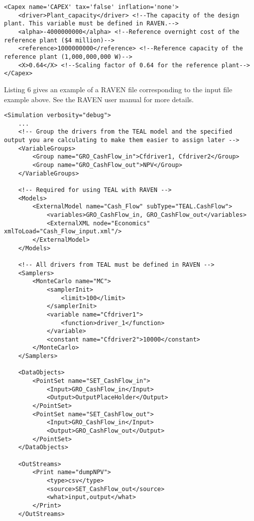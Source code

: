 \begin{lstlisting}[style=XML,morekeywords={anAttribute},caption=CashFlow input example., label=lst:CashFlowExample]
<Capex name='CAPEX' tax='false' inflation='none'>
    <driver>Plant_capacity</driver> <!--The capacity of the design plant. This variable must be defined in RAVEN.-->
    <alpha>-4000000000</alpha> <!--Reference overnight cost of the reference plant ($4 million)-->
    <reference>1000000000</reference> <!--Reference capacity of the reference plant (1,000,000,000 W)-->
    <X>0.64</X> <!--Scaling factor of 0.64 for the reference plant-->
</Capex>
\end{lstlisting}

Listing 6 gives an example of a RAVEN file corresponding to the input file example above. See the RAVEN user manual for more details.
\begin{lstlisting}[style=XML,morekeywords={anAttribute},caption=Raven input example using CashFlow external model., label=lst:RAVENExample]
<Simulation verbosity="debug">
    ...
    <!-- Group the drivers from the TEAL model and the specified output you are calculating to make them easier to assign later -->
    <VariableGroups>
        <Group name="GRO_CashFlow_in">Cfdriver1, Cfdriver2</Group>
        <Group name="GRO_CashFlow_out">NPV</Group>
    </VariableGroups>

    <!-- Required for using TEAL with RAVEN -->
    <Models>
        <ExternalModel name="Cash_Flow" subType="TEAL.CashFlow">
            <variables>GRO_CashFlow_in, GRO_CashFlow_out</variables>
            <ExternalXML node="Economics" xmlToLoad="Cash_Flow_input.xml"/>
        </ExternalModel>
    </Models>

    <!-- All drivers from TEAL must be defined in RAVEN -->
    <Samplers>
        <MonteCarlo name="MC">
            <samplerInit>
                <limit>100</limit>
            </samplerInit>
            <variable name="Cfdriver1">
                <function>driver_1</function>
            </variable>
            <constant name="Cfdriver2">10000</constant>
        </MonteCarlo>
    </Samplers>

    <DataObjects>
        <PointSet name="SET_CashFlow_in">
            <Input>GRO_CashFlow_in</Input>
            <Output>OutputPlaceHolder</Output>
        </PointSet>
        <PointSet name="SET_CashFlow_out">
            <Input>GRO_CashFlow_in</Input>
            <Output>GRO_CashFlow_out</Output>
        </PointSet>
    </DataObjects>

    <OutStreams>
        <Print name="dumpNPV">
            <type>csv</type>
            <source>SET_CashFlow_out</source>
            <what>input,output</what>
        </Print>
    </OutStreams>


\end{lstlisting}
